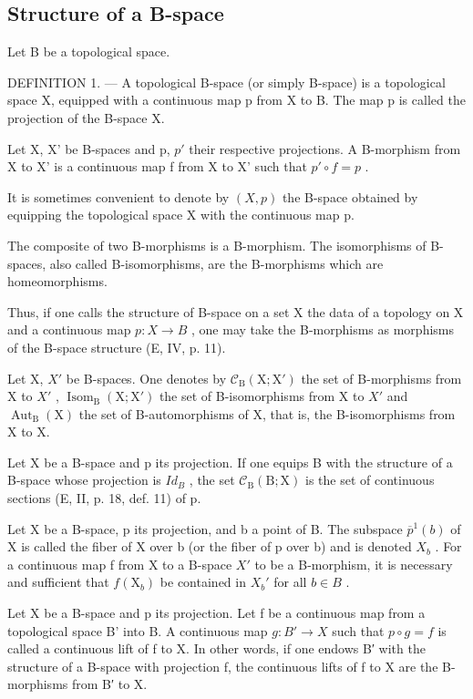 \subsection{Structure of a B-space}

Let B be a topological space.

DEFINITION 1. --- A topological B-space (or simply B-space) is a topological space X, equipped with a continuous map p from X to B. The map p is called the projection of the B-space X.

Let X, X' be B-spaces and p, \(p'\) their respective projections. A B-morphism from X to X' is a continuous map f from X to X' such that \(p' \circ f = p\) .

It is sometimes convenient to denote by \((X,p)\) the B-space obtained by equipping the topological space X with the continuous map p.

The composite of two B-morphisms is a B-morphism. The isomorphisms of B-spaces, also called B-isomorphisms, are the B-morphisms which are homeomorphisms.

Thus, if one calls the structure of B-space on a set X the data of a topology on X and a continuous map \(p: X \rightarrow B\) , one may take the B-morphisms as morphisms of the B-space structure (E, IV, p. 11).

Let X, \(X'\) be B-spaces. One denotes by \(\mathcal{C}_{\mathrm{B}}(\mathrm{X};\mathrm{X}')\) the set of B-morphisms from X to \(X'\) , \(\operatorname{Isom}_{\mathrm{B}}(\mathrm{X};\mathrm{X}')\) the set of B-isomorphisms from X to \(X'\) and \(\operatorname{Aut}_{\mathrm{B}}(\mathrm{X})\) the set of B-automorphisms of X, that is, the B-isomorphisms from X to X.

Let X be a B-space and p its projection. If one equips B with the structure of a B-space whose projection is \(Id_{B}\) , the set \(\mathcal{C}_{\mathrm{B}}(\mathrm{B};\mathrm{X})\) is the set of continuous sections (E, II, p. 18, def. 11) of p.

Let X be a B-space, p its projection, and b a point of B. The subspace \(\overline{p}^{1}(b)\) of X is called the fiber of X over b (or the fiber of p over b) and is denoted \(X_{b}\) . For a continuous map f from X to a B-space \(X'\) to be a B-morphism, it is necessary and sufficient that \(f(\mathrm{X}_{b})\) be contained in \(X_{b}'\) for all \(b \in B\) .

Let X be a B-space and p its projection. Let f be a continuous map from a topological space B' into B. A continuous map \(g: B' \to X\) such that \(p \circ g = f\) is called a continuous lift of f to X. In other words, if one endows B′ with the structure of a B-space with projection f, the continuous lifts of f to X are the B-morphisms from B′ to X.


